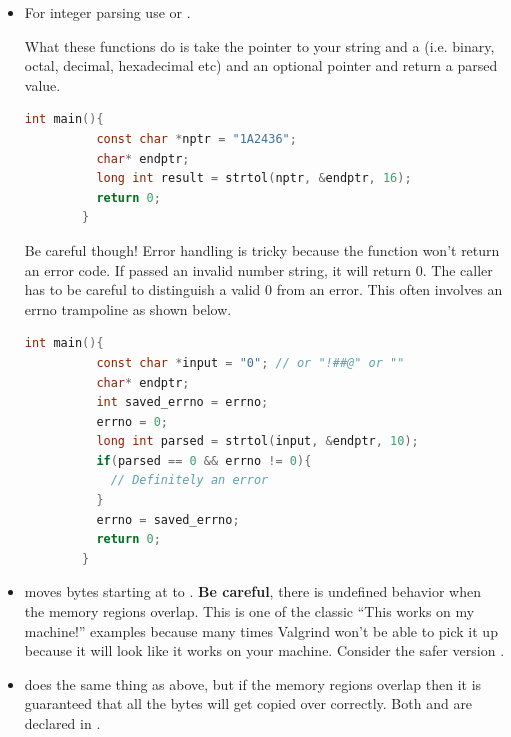 \begin{itemize}
	      \textbf{Output}

	      \begin{lstlisting}
strtok
is
tricky
!!
\end{lstlisting}

	      Why is it tricky? Well what happens when upped is changed to the following?

	      \begin{lstlisting}[language=C]
        char* upped = strdup("strtok,is,tricky,,,!!");
\end{lstlisting}

	\item For integer parsing use
	      or
	      .

	      What these functions do is take the pointer to your string
	       and a  (i.e. binary, octal, decimal,
	      hexadecimal etc) and an optional pointer  and return a
	      parsed value.

	      \begin{lstlisting}[language=C]
        int main(){
          const char *nptr = "1A2436";
          char* endptr;
          long int result = strtol(nptr, &endptr, 16);
          return 0;
        }
\end{lstlisting}

	      Be careful though!
        Error handling is tricky because the function won't return an error code.
        If passed an invalid number string, it will return 0.
        The caller has to be careful to distinguish a valid 0 from an error.
        This often involves an errno trampoline as shown below.

	      \begin{lstlisting}[language=C]
        int main(){
          const char *input = "0"; // or "!##@" or ""
          char* endptr;
          int saved_errno = errno;
          errno = 0;
          long int parsed = strtol(input, &endptr, 10);
          if(parsed == 0 && errno != 0){
            // Definitely an error
          }
          errno = saved_errno;
          return 0;
        }
\end{lstlisting}

	    \item {} moves  bytes starting at  to .
        \textbf{Be careful}, there is undefined behavior when the memory regions overlap.
        This is one of the classic ``This works on my machine!'' examples because many times Valgrind won't be able to pick it up because it will look like it works on your machine.
        Consider the safer version .

	    \item {} does the same thing as above, but if the memory regions overlap then it is guaranteed that all the bytes will get copied over correctly.
        Both  and  are declared in .
\end{itemize}



